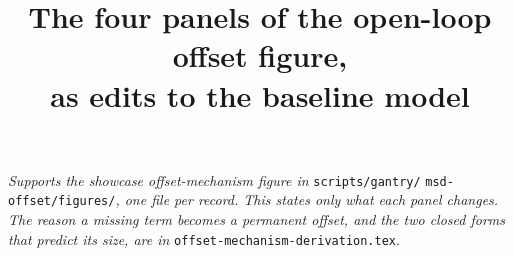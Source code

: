 \documentclass[11pt]{article}
\title{The four panels of the open-loop offset figure,\\ as edits to the baseline model}
\date{}
\begin{document}
\maketitle
\vspace{-10mm}

\noindent\textit{Supports the showcase offset-mechanism figure in}
\texttt{scripts/gantry/} \texttt{msd-offset/figures/}\textit{, one file per record. This states
only what each panel changes. The reason a missing term becomes a permanent offset, and the
two closed forms that predict its size, are in} \texttt{offset-mechanism-derivation.tex}.

\bigskip


\end{document}
